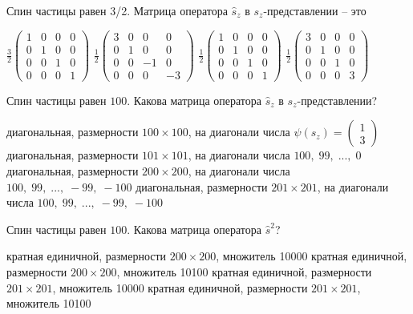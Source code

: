\documentclass[11pt,a4paper]{exam}
\begin{document}
\begin{questions}
\question Спин частицы равен 3/2. Матрица оператора ${\hat s_z}$ в ${s_z}$-представлении – это
\begin{choices}
\choice $\frac{3}{2}\left( {\begin{array}{*{20}{c}}
1&0&0&0\\
0&1&0&0\\
0&0&1&0\\
0&0&0&1
\end{array}} \right)$   
\choice $\frac{1}{2}\left( {\begin{array}{*{20}{c}}
3&0&0&0\\
0&1&0&0\\
0&0&{ - 1}&0\\
0&0&0&{ - 3}
\end{array}} \right)$      
\choice $\frac{1}{2}\left( {\begin{array}{*{20}{c}}
1&0&0&0\\
0&1&0&0\\
0&0&1&0\\
0&0&0&1
\end{array}} \right)$   
\choice $\frac{1}{2}\left( {\begin{array}{*{20}{c}}
3&0&0&0\\
0&1&0&0\\
0&0&1&0\\
0&0&0&3
\end{array}} \right)$
\end{choices}

\question Спин частицы равен $100$. Какова матрица оператора ${\hat s_z}$ в ${s_z}$-представлении?
\begin{choices}
\choice диагональная, размерности $100 \times 100$, на диагонали числа $\psi ({s_z}) = \left( {\begin{array}{*{20}{c}}
1\\
3
\end{array}} \right)$
\choice диагональная, размерности $101 \times 101$, на диагонали числа $100,\;99,\;...,\;0$
\choice диагональная, размерности $200 \times 200$, на диагонали числа $100,\;99,\;...,\; - 99,\; - 100$   
\choice диагональная, размерности $201 \times 201$, на диагонали числа $100,\;99,\;...,\; - 99,\; - 100$
\end{choices}

\question Спин частицы равен $100$. Какова матрица оператора ${\hat s^2}$?
\begin{choices}
\choice кратная единичной, размерности $200 \times 200$, множитель 10000
\choice кратная единичной, размерности $200 \times 200$, множитель 10100
\choice кратная единичной, размерности $201 \times 201$, множитель 10000  
\choice кратная единичной,  размерности $201 \times 201$, множитель 10100
\end{choices}


\end{questions}
\end{document}
